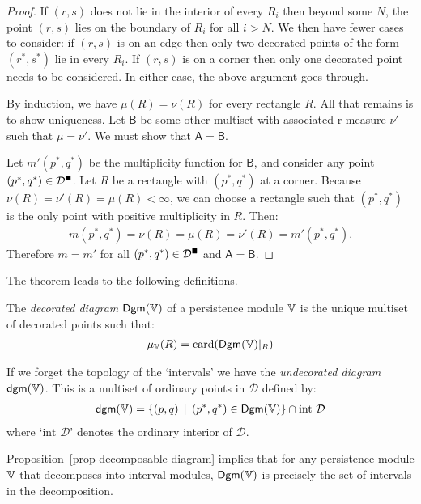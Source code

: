 \begin{proof}
If $(r, s)$ does not lie in the interior of every $R_i$ then beyond some $N$, the point $(r, s)$ lies on the boundary of $R_i$ for all $i > N$. We then have fewer cases to consider: if $(r, s)$ is on an edge then only two decorated points of the form $(r^*, s^*)$ lie in every $R_i$. If $(r, s)$ is on a corner then only one decorated point needs to be considered. In either case, the above argument goes through.

By induction, we have $\mu(R) = \nu(R)$ for every rectangle $R$. All that remains is to show uniqueness. Let $\mathsf{B}$ be some other multiset with associated r-measure $\nu'$ such that $\mu = \nu'$. We must show that $\mathsf{A} = \mathsf{B}$.

Let $m'(p^*, q^*)$ be the multiplicity function for $\mathsf{B}$, and consider any point $(p^*, q^*) \in \mathcal{D}^\rint$. Let $R$ be a rectangle with $(p^*, q^*)$ at a corner. Because $\nu(R) = \nu'(R) = \mu(R) < \infty$, we can choose a rectangle such that $(p^*, q^*)$ is the only point with positive multiplicity in $R$. Then:
\begin{align*}
m(p^*, q^*) = \nu(R) = \mu(R) = \nu'(R) = m'(p^*, q^*).
\end{align*}
Therefore $m = m'$ for all $(p^*, q^*) \in \mathcal{D}^\rint$ and $\mathsf{A} = \mathsf{B}$.
\end{proof}

The theorem leads to the following definitions.

\begin{definition}
The \emph{decorated diagram} $\mathsf{Dgm}(\mathbb{V})$ of a persistence module $\mathbb{V}$ is the unique multiset of decorated points such that:
\begin{align*}
\mu_{\mathbb{V}}(R) = \operatorname{card}(\mathsf{Dgm}(\mathbb{V})|_R)
\end{align*}

If we forget the topology of the `intervals' we have the \emph{undecorated diagram} $\mathsf{dgm}(\mathbb{V})$. This is a multiset of ordinary points in $\mathcal{D}$ defined by:
\begin{align*}
\mathsf{dgm}(\mathbb{V}) = \{ (p, q) \, \mid \, (p^*, q^*) \in \mathsf{Dgm}(\mathbb{V}) \} \cap \text{int } \mathcal{D}
\end{align*}
where `$\text{int } \mathcal{D}$' denotes the ordinary interior of $\mathcal{D}$.
\end{definition}

Proposition~\ref{prop-decomposable-diagram} implies that for any persistence module $\mathbb{V}$ that decomposes into interval modules, $\mathsf{Dgm}(\mathbb{V})$ is precisely the set of intervals in the decomposition.

